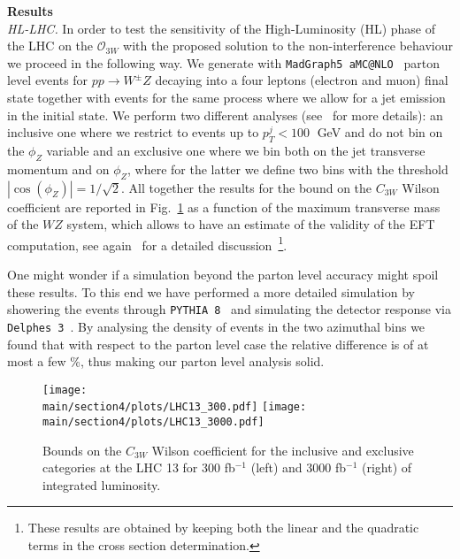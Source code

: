 \noindent
{\bf Results}\\
\emph{HL-LHC.} In order to test the sensitivity of the High-Luminosity (HL) phase of the LHC on the $\mathcal{O}_{3W}$ with the proposed solution to the non-interference behaviour we proceed in the following way. We generate with {\tt MadGraph5 aMC@NLO}~\cite{Alwall:2014hca} parton level events for $pp \to W^{\pm} Z $ decaying into a four leptons (electron and muon) final state together with events for the same process where we allow for a jet emission in the initial state. We perform two different analyses (see~\cite{Azatov:2017kzw} for more details): an inclusive one where we restrict to events up to $p_T^j<100\;$ GeV and do not bin on the $\phi_Z$ variable and an exclusive one where we bin both on the jet transverse momentum and on $\phi_Z$, where for the latter we define two bins with the threshold $|\cos(\phi_Z)|=1/\sqrt{2}$. All together the results for the bound on the $C_{3W}$ Wilson coefficient are reported in Fig.~\ref{fig:LHC13} as a function of the maximum transverse mass of the $WZ$ system, which allows to have an estimate of the validity of the EFT computation, see again~\cite{Azatov:2017kzw} for a detailed discussion~\footnote{These results are obtained by keeping both the linear and the quadratic terms in the cross section determination.}.

One might wonder if a simulation beyond the parton level accuracy might spoil these results. To this end we have performed a more detailed simulation by showering the events through {\tt PYTHIA 8}~\cite{Alwall:2014hca} and simulating the detector response via {\tt Delphes 3}~\cite{deFavereau:2013fsa}. By analysing the density of events in the two azimuthal bins we found that with respect to the parton level case the relative difference is of at most a few \%, thus making our parton level analysis solid.


  
  \begin{figure}[ht]
\begin{center}
 \texttt{[image: \\main/section4/plots/LHC13\_300.pdf]}{}\hspace{2cm}
 \texttt{[image: \\main/section4/plots/LHC13\_3000.pdf]}{}
\end{center}
\caption{Bounds on the $C_{3W}$ Wilson coefficient for the inclusive and exclusive categories at the LHC 13 for 300 fb$^{-1}$ (left) and 3000 fb$^{-1}$ (right) of integrated luminosity.}
\label{fig:LHC13}
\end{figure}


